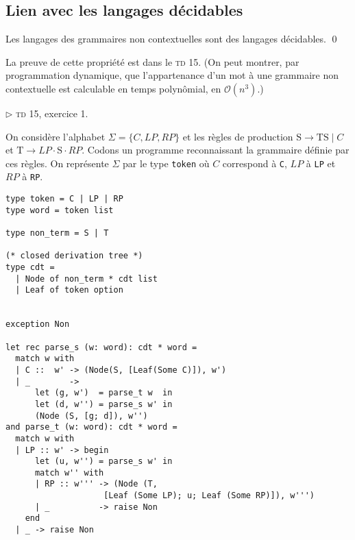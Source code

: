 \subsection{Lien avec les langages décidables}

\begin{prop}
	Les langages des grammaires non contextuelles sont des langages décidables.
	\qed
\end{prop}

La preuve de cette propriété est dans le \textsc{td} 15. (On peut montrer, par programmation dynamique, que l'appartenance d'un mot à une grammaire non contextuelle est calculable en temps polynômial, en $\mathcal{O}(n^3)$.)

\begin{exm}
	$\triangleright$ \textsc{td} 15, exercice 1.
\end{exm}

\begin{exm}
	On considère l'alphabet $\Sigma = \{C, L\!P, R\!P\}$ et les règles de production $\mathrm{S} \to \mathrm{TS}  \mid C$ et $\mathrm{T} \to L\!P \cdot \mathrm{S} \cdot R\!P$.
	Codons un programme reconnaissant la grammaire définie par ces règles.
	On représente $\Sigma$ par le type \texttt{token} où $C$ correspond à \texttt{C}, $L\!P$ à \texttt{LP} et $R\!P$ à \texttt{RP}.

	\begin{lstlisting}[language=caml,caption=Programme reconnaissant une grammaire $\mathcal{G}$]
type token = C | LP | RP
type word = token list

type non_term = S | T

(* closed derivation tree *)
type cdt =
  | Node of non_term * cdt list
  | Leaf of token option


exception Non

let rec parse_s (w: word): cdt * word =
  match w with
  | C ::  w' -> (Node(S, [Leaf(Some C)]), w')
  | _        ->
      let (g, w')  = parse_t w  in
      let (d, w'') = parse_s w' in
      (Node (S, [g; d]), w'')
and parse_t (w: word): cdt * word =
  match w with
  | LP :: w' -> begin
      let (u, w'') = parse_s w' in
      match w'' with
      | RP :: w''' -> (Node (T,
					[Leaf (Some LP); u; Leaf (Some RP)]), w''')
      | _          -> raise Non
    end
  | _ -> raise Non
	\end{lstlisting}
\end{exm}


